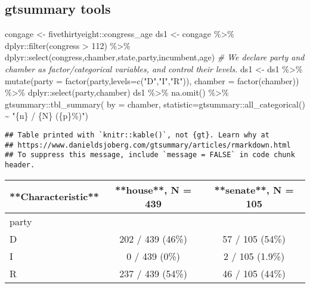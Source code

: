 \documentclass[
]{book}
\newenvironment{Shaded}{\begin{snugshade}}{\end{snugshade}}
\newcommand{\AttributeTok}[1]{\textcolor[rgb]{0.77,0.63,0.00}{#1}}
\newcommand{\CommentTok}[1]{\textcolor[rgb]{0.56,0.35,0.01}{\textit{#1}}}
\newcommand{\DecValTok}[1]{\textcolor[rgb]{0.00,0.00,0.81}{#1}}
\newcommand{\FunctionTok}[1]{\textcolor[rgb]{0.00,0.00,0.00}{#1}}
\newcommand{\NormalTok}[1]{#1}
\newcommand{\OtherTok}[1]{\textcolor[rgb]{0.56,0.35,0.01}{#1}}
\newcommand{\SpecialCharTok}[1]{\textcolor[rgb]{0.00,0.00,0.00}{#1}}
\newcommand{\StringTok}[1]{\textcolor[rgb]{0.31,0.60,0.02}{#1}}
\begin{document}
\hypertarget{gtsummary-tools}{%
\subsection{gtsummary tools}\label{gtsummary-tools}}

\begin{Shaded}
\begin{Highlighting}[]
\NormalTok{congage }\OtherTok{\textless{}{-}}\NormalTok{ fivethirtyeight}\SpecialCharTok{::}\NormalTok{congress\_age}
\NormalTok{ds1 }\OtherTok{\textless{}{-}}\NormalTok{ congage }\SpecialCharTok{\%\textgreater{}\%}\NormalTok{ dplyr}\SpecialCharTok{::}\FunctionTok{filter}\NormalTok{(congress }\SpecialCharTok{\textgreater{}} \DecValTok{112}\NormalTok{) }\SpecialCharTok{\%\textgreater{}\%}\NormalTok{ dplyr}\SpecialCharTok{::}\FunctionTok{select}\NormalTok{(congress,chamber,state,party,incumbent,age) }
\CommentTok{\#  We declare party and chamber as factor/categorical variables, and control their levels.}
\NormalTok{ds1 }\OtherTok{\textless{}{-}}\NormalTok{ ds1 }\SpecialCharTok{\%\textgreater{}\%} \FunctionTok{mutate}\NormalTok{(}\AttributeTok{party =} \FunctionTok{factor}\NormalTok{(party,}\AttributeTok{levels=}\FunctionTok{c}\NormalTok{(}\StringTok{"D"}\NormalTok{,}\StringTok{"I"}\NormalTok{,}\StringTok{"R"}\NormalTok{)),}
                    \AttributeTok{chamber =} \FunctionTok{factor}\NormalTok{(chamber)) }\SpecialCharTok{\%\textgreater{}\%}\NormalTok{ dplyr}\SpecialCharTok{::}\FunctionTok{select}\NormalTok{(party,chamber)}
\NormalTok{ds1 }\SpecialCharTok{\%\textgreater{}\%} 
  \FunctionTok{na.omit}\NormalTok{() }\SpecialCharTok{\%\textgreater{}\%}
\NormalTok{  gtsummary}\SpecialCharTok{::}\FunctionTok{tbl\_summary}\NormalTok{(}
    \AttributeTok{by =}\NormalTok{ chamber,}
    \AttributeTok{statistic=}\NormalTok{gtsummary}\SpecialCharTok{::}\FunctionTok{all\_categorical}\NormalTok{() }\SpecialCharTok{\textasciitilde{}} \StringTok{"\{n\} / \{N\} (\{p\}\%)"}\NormalTok{)}
\end{Highlighting}
\end{Shaded}

\begin{verbatim}
## Table printed with `knitr::kable()`, not {gt}. Learn why at
## https://www.danieldsjoberg.com/gtsummary/articles/rmarkdown.html
## To suppress this message, include `message = FALSE` in code chunk header.
\end{verbatim}

\begin{tabular}{l|c|c}
\hline
**Characteristic** & **house**, N = 439 & **senate**, N = 105\\
\hline
party &  & \\
\hline
D & 202 / 439 (46\%) & 57 / 105 (54\%)\\
\hline
I & 0 / 439 (0\%) & 2 / 105 (1.9\%)\\
\hline
R & 237 / 439 (54\%) & 46 / 105 (44\%)\\
\hline
\end{tabular}
\end{document}
